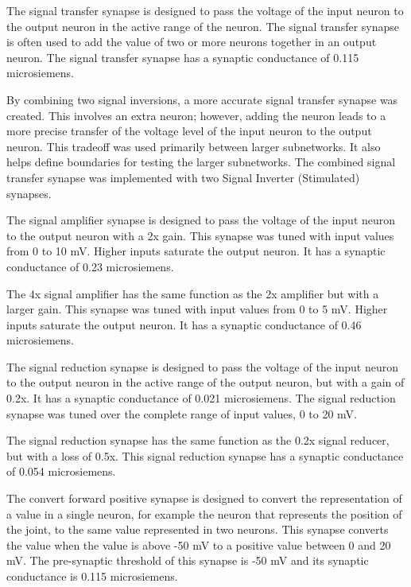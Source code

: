 
The signal transfer synapse is designed to pass the voltage of the input neuron
to the output neuron in the active range of the neuron. The signal transfer synapse is often used to add
the value of two or more neurons together in an output neuron.
The signal transfer synapse has a synaptic 
conductance of 0.115 microsiemens. 


By combining two signal inversions, a more accurate signal transfer synapse was
created. This involves an extra neuron; however, adding the neuron leads to a more precise
transfer of the voltage level of the input neuron to the output neuron. This tradeoff was used primarily between larger subnetworks. It also helps define boundaries for testing the larger subnetworks. The combined signal transfer synapse was implemented with two Signal Inverter (Stimulated)
synapses.


The signal amplifier synapse is designed to pass the voltage of the input neuron
to the output neuron with a 2x gain. This synapse was tuned with input values from 0 to
10 mV. Higher inputs saturate the output neuron. It has a synaptic conductance
of 0.23 microsiemens.


The 4x signal amplifier has the same function as the 2x amplifier but with a larger 
gain. This synapse was tuned with input values from 0 to
5 mV. Higher inputs saturate the output neuron. It has a synaptic conductance
of 0.46 microsiemens.


The signal reduction synapse is designed to pass the voltage of the input neuron
to the output neuron in the active range of the output neuron, but with a gain of 0.2x. 
It has a synaptic  conductance of 0.021 microsiemens. The signal reduction synapse was tuned
over the complete range of input values, 0 to 20 mV.


The signal reduction synapse has the same function as the 0.2x signal reducer, but with a loss of 0.5x. This signal reduction synapse has a synaptic  conductance of 0.054 microsiemens.


The convert forward positive synapse is designed to convert the representation
of a value in a single neuron, for example the neuron that represents the 
position of the joint, to the same value represented in two neurons. This
synapse converts the value when the value is above -50 mV to a positive value between 0 
and 20 mV. The pre-synaptic
threshold of this synapse is -50 mV and its synaptic conductance is 0.115 microsiemens.

